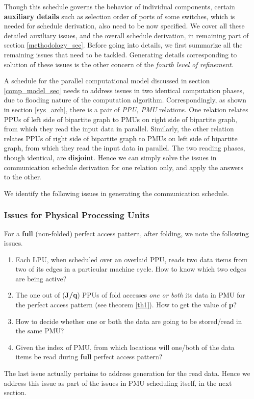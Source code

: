 \documentclass[12pt]{article}
\newcounter{saveissueFi}
\begin{document}
Though this schedule governs
the behavior of individual components, certain \textbf{auxiliary details} such as
selection order of ports of
some switches, which is needed for schedule derivation,
also need to be now specified. We cover all these detailed
auxiliary issues, and the overall schedule derivation, in
remaining part of section \ref{methodology_sec}. Before going into
details, we first summarize all the remaining issues that need to be
tackled. Generating details corresponding to solution of these issues
is the other concern of the \textit{fourth level of refinement}.

A schedule for the parallel computational model discussed in section
\ref{comp_model_sec} needs to address issues in two identical computation
phases, due to flooding nature of the computation algorithm. 
Correspondingly, as shown in section \ref{sys_arch}, there is a pair of
\textit{PPU, PMU} relations. One
relation relates
PPUs of left side of bipartite graph to PMUs on right
side of bipartite graph, from which they read the input data in parallel.
Similarly, the other relation relates PPUs of right side of
bipartite graph to PMUs on left side of bipartite graph, from
which they read the input data in parallel. The two reading phases, though
identical, are \textbf{disjoint}. Hence we can simply solve the issues in
communication schedule derivation for one relation only, and apply the
answers to the other.

We identify the following issues in generating the communication schedule.

\subsubsection{Issues for Physical Processing Units}
\label{fissues_sec}
For a \textbf{full} (non-folded) perfect access pattern, after folding, we note the
following issues.
\begin{enumerate}
\item Each LPU, when scheduled over an
overlaid PPU, reads two data items from two of its edges in a
particular machine cycle. How to know which two edges are being active?
\item The  one out of (\textbf{J/q}) PPUs of  fold
accesses \textit{one or both} its data in  PMU for the 
perfect access pattern (see theorem \ref{th1}). How to get the value of \textbf{p}?
\item How to decide whether one or both the data are going to be
stored/read in the same PMU?
\item Given the index of PMU, from which
locations will one/both of the data items be read during 
\textbf{full} perfect access pattern?
\setcounter{saveissueFi}{\theenumi}
\end{enumerate}
The last issue actually pertains to address generation for the read data.
Hence we address this issue as part of the issues in PMU
scheduling itself, in the next section.
\end{document}
